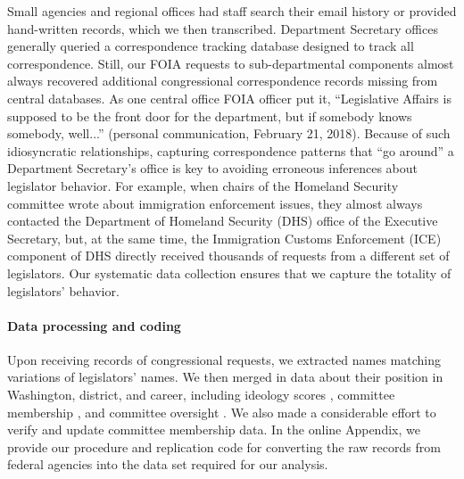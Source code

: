 \documentclass[12pt]{article}
\begin{document}
{Small agencies and regional offices had staff search their email history or provided hand-written records, which we then transcribed. Department Secretary offices generally queried a correspondence tracking database designed to track all correspondence. Still, our FOIA requests to sub-departmental components almost always recovered additional congressional correspondence records missing from central databases. As one central office FOIA officer put it, ``Legislative Affairs is supposed to be the front door for the department, but if somebody knows somebody, well...'' (personal communication, February 21, 2018). Because of such idiosyncratic relationships, capturing correspondence patterns that ``go around'' a Department Secretary's office is key to avoiding erroneous inferences about legislator behavior. For example, when chairs of the Homeland Security committee wrote about immigration enforcement issues, they almost always contacted the Department of Homeland Security (DHS) office of the Executive Secretary, but, at the same time, the Immigration Customs Enforcement (ICE) component of DHS directly received thousands of requests from a different set of legislators. Our systematic data collection ensures that we capture the totality of legislators' behavior.

\paragraph{Data processing and coding} Upon receiving records of congressional requests, we extracted names matching variations of legislators' names. We then merged in data about their position in Washington, district, and career, including ideology scores \citep{dwnominate2018}, committee membership \citep{StewartWoon2017}, and committee oversight \citep{LewisSelin2012}. We also made a considerable effort to verify and update committee membership data. 
In the online Appendix, we provide our procedure and replication code for converting the raw records from federal agencies into the data set required for our analysis. 

}
\end{document}
